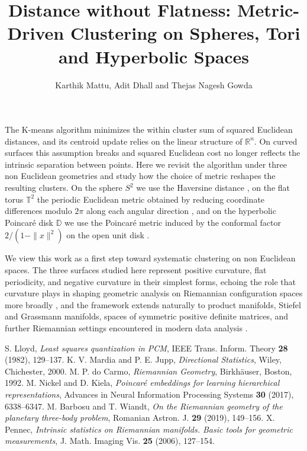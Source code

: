 \documentclass[12pt,a4paper]{amsart}
\numberwithin{equation}{section}
\begin{document}
\title{Distance without Flatness: Metric-Driven Clustering on Spheres, Tori
and Hyperbolic Spaces}
\author{Karthik Mattu, Adit Dhall and Thejas Nagesh Gowda}
\address{Data and Predictive Analytics Center, School of Mathematics and Statistics, College of Science, Rochester Institute of Technology,
Rochester, NY, USA}
\address{Data and Predictive Analytics Center, School of Mathematics and Statistics, College of Science, Rochester Institute of Technology,
Rochester, NY, USA}
\address{Data and Predictive Analytics Center, School of Mathematics and Statistics, College of Science, Rochester Institute of Technology,
Rochester, NY, USA}
\maketitle

\noindent The K-means algorithm \cite{L} minimizes the within cluster sum of squared
Euclidean distances, and its centroid update relies on the linear structure
of $\mathbb{R}^{n}$. On curved surfaces this assumption breaks and squared
Euclidean cost no longer reflects the intrinsic separation between points. Here we revisit
the algorithm under three non Euclidean geometries and study how the choice
of metric reshapes the resulting clusters. On the sphere $S^{2}$ we use the
Haversine distance \cite{MJ}, on the flat torus $\mathbb{T}^{2}$ the periodic
Euclidean metric obtained by reducing coordinate differences modulo $2\pi$
along each angular direction \cite{dC}, and on the hyperbolic Poincar\'e disk
$\mathbb{D}$ we use the Poincar\'e metric induced by the conformal factor
$2/(1-\|x\|^{2})$ on the open unit disk \cite{NK}.

We view this work as a first step toward systematic clustering on non Euclidean
spaces. The three surfaces studied here represent positive curvature, flat
periodicity, and negative curvature in their simplest forms, echoing the role
that curvature plays in shaping geometric analysis on Riemannian configuration
spaces more broadly \cite{BW}, and the framework extends naturally to product
manifolds, Stiefel and Grassmann manifolds, spaces of symmetric positive
definite matrices, and further Riemannian settings encountered in modern data
analysis \cite{P}.

\begin{thebibliography}{99}
 S. Lloyd, {\it Least squares quantization in PCM}, IEEE Trans.
Inform. Theory {\bf 28} (1982), 129--137.
 K. V. Mardia and P. E. Jupp, {\it Directional Statistics},
Wiley, Chichester, 2000.
 M. P. do Carmo, {\it Riemannian Geometry}, Birkh\"auser,
Boston, 1992.
 M. Nickel and D. Kiela, {\it Poincar\'e embeddings for learning
hierarchical representations}, Advances in Neural Information Processing
Systems {\bf 30} (2017), 6338--6347.
 M. Barbosu and T. Wiandt, {\it On the Riemannian geometry of
the planetary three-body problem}, Romanian Astron. J. {\bf 29} (2019),
149--156.
 X. Pennec, {\it Intrinsic statistics on Riemannian manifolds.
Basic tools for geometric measurements}, J. Math. Imaging Vis. {\bf 25}
(2006), 127--154.
\end{thebibliography}
\end{document}
